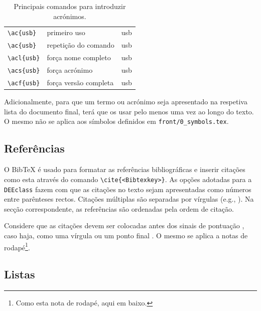 \begin{table}[htb]
	\caption{Principais comandos para introduzir acrónimos.}
	\label{tab:acros}
	\centering
	\begin{tabular}{l l l}
	\toprule
	\tabhead{Comando} & \tabhead{} & \tabhead{Resultado} \\
	\midrule
		\verb|\ac{usb}| & primeiro uso & \ac{usb}\\
		\verb|\ac{usb}| & repetição do comando & \ac{usb}\\
		\verb|\acl{usb}| & força nome completo & \acl{usb}\\
		\verb|\acs{usb}| & força acrónimo & \acs{usb}\\
		\verb|\acf{usb}| & força versão completa & \acf{usb}\\
	\bottomrule
	\end{tabular}
\end{table}

Adicionalmente, para que um termo ou acrónimo seja apresentado na respetiva lista do documento final, terá que os usar pelo menos uma vez ao longo do texto. O mesmo não se aplica aos símbolos definidos em \verb|front/0_symbols.tex|.


\subsection{Referências}

O BibTeX é usado para formatar as referências bibliográficas e inserir citações como esta \cite{W3C05} através do comando \verb|\cite{<Bibtexkey>}|. As opções adotadas para a \verb|DEEclass| fazem com que as citações no texto sejam apresentadas como números entre parênteses rectos. Citações múltiplas são separadas por vírgulas (e.g., \cite{Lipsum08, Li00, Candy92}). Na secção correspondente, as referências são ordenadas pela ordem de citação. 

Considere que as citações \cite{Motorola96} devem ser colocadas antes dos sinais de pontuação \cite{Jain87}, caso haja, como uma vírgula ou um ponto final \cite{Delorme95}. O mesmo se aplica a notas de rodapé\footnote{Como esta nota de rodapé, aqui em baixo.}.


\subsection{Listas}

